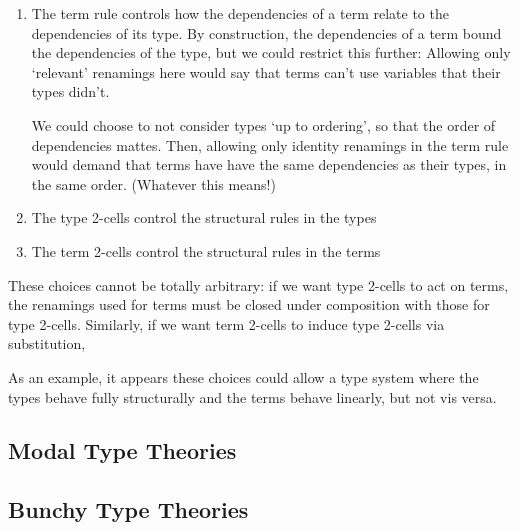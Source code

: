 \documentclass[10pt]{article}
\begin{document}
\begin{enumerate}
\item The term rule controls how the dependencies of a term relate to the dependencies of its type. By construction, the dependencies of a term bound the dependencies of the type, but we could restrict this further: Allowing only `relevant' renamings here would say that terms can't use variables that their types didn't.

We could choose to not consider types `up to ordering', so that the order of dependencies mattes. Then, allowing only identity renamings in the term rule would demand that terms have have the same dependencies as their types, in the same order. (Whatever this means!)

\item The type 2-cells control the structural rules in the types
\item The term 2-cells control the structural rules in the terms
\end{enumerate}

These choices cannot be totally arbitrary: if we want type 2-cells to act on terms, the renamings used for terms must be closed under composition with those for type 2-cells. Similarly, if we want term 2-cells to induce type 2-cells via substitution, 

As an example, it appears these choices could allow a type system where the types behave fully structurally and the terms behave linearly, but not vis versa.

\subsection{Modal Type Theories}
\subsection{Bunchy Type Theories}
\end{document}
